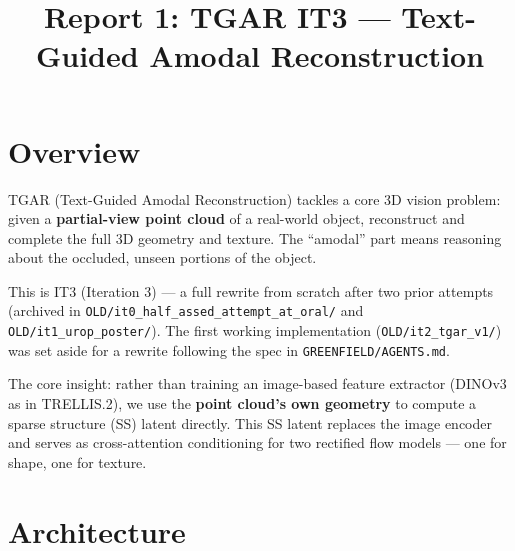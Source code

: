 \title{Report 1: TGAR IT3 --- Text-Guided Amodal Reconstruction}

\maketitle

\section{Overview}

TGAR (Text-Guided Amodal Reconstruction) tackles a core 3D vision problem:
given a \textbf{partial-view point cloud} of a real-world object, reconstruct and
complete the full 3D geometry and texture. The ``amodal'' part means reasoning
about the occluded, unseen portions of the object.

This is IT3 (Iteration 3) --- a full rewrite from scratch after two prior
attempts (archived in \texttt{OLD/it0\_half\_assed\_attempt\_at\_oral/} and
\texttt{OLD/it1\_urop\_poster/}). The first working implementation
(\texttt{OLD/it2\_tgar\_v1/}) was set aside for a rewrite following the spec in
\texttt{GREENFIELD/AGENTS.md}.

The core insight: rather than training an image-based feature extractor
(DINOv3 as in TRELLIS.2), we use the \textbf{point cloud's own geometry} to
compute a sparse structure (SS) latent directly. This SS latent replaces
the image encoder and serves as cross-attention conditioning for two
rectified flow models --- one for shape, one for texture.

\section{Architecture}

